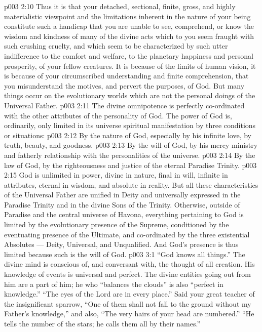 \vs p003 2:10 Thus it is that your detached, sectional, finite, gross, and highly materialistic viewpoint and the limitations inherent in the nature of your being constitute such a handicap that you are unable to see, comprehend, or know the wisdom and kindness of many of the divine acts which to you seem fraught with such crushing cruelty, and which seem to be characterized by such utter indifference to the comfort and welfare, to the planetary happiness and personal prosperity, of your fellow creatures. It is because of the limits of human vision, it is because of your circumscribed understanding and finite comprehension, that you misunderstand the motives, and pervert the purposes, of God. But many things occur on the evolutionary worlds which are not the personal doings of the Universal Father.
\vs p003 2:11 \pc The divine omnipotence is perfectly co\hyp{}ordinated with the other attributes of the personality of God. The power of God is, ordinarily, only limited in its universe spiritual manifestation by three conditions or situations:
\vs p003 2:12 \bibnobreakspace By the nature of God, especially by his infinite love, by truth, beauty, and goodness.
\vs p003 2:13 \bibnobreakspace By the will of God, by his mercy ministry and fatherly relationship with the personalities of the universe.
\vs p003 2:14 \bibnobreakspace By the law of God, by the righteousness and justice of the eternal Paradise Trinity.
\vs p003 2:15 \pc God is unlimited in power, divine in nature, final in will, infinite in attributes, eternal in wisdom, and absolute in reality. But all these characteristics of the Universal Father are unified in Deity and universally expressed in the Paradise Trinity and in the divine Sons of the Trinity. Otherwise, outside of Paradise and the central universe of Havona, everything pertaining to God is limited by the evolutionary presence of the Supreme, conditioned by the eventuating presence of the Ultimate, and co\hyp{}ordinated by the three existential Absolutes --- Deity, Universal, and Unqualified. And God’s presence is thus limited because such is the will of God.
\vs p003 3:1 “God knows all things.” The divine mind is conscious of, and conversant with, the thought of all creation. His knowledge of events is universal and perfect. The divine entities going out from him are a part of him; he who “balances the clouds” is also “perfect in knowledge.” “The eyes of the Lord are in every place.” Said your great teacher of the insignificant sparrow, “One of them shall not fall to the ground without my Father’s knowledge,” and also, “The very hairs of your head are numbered.” “He tells the number of the stars; he calls them all by their names.”
